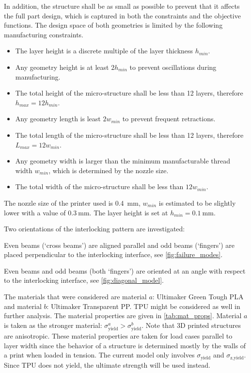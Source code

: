 In addition, the structure shall be as small as possible to prevent that it affects the full part design, which is captured in both the constraints and the objective functions.
The design space of both geometries is limited by the following manufacturing constraints.
\begin{itemize}
	\setlength\itemsep{0mm}
	\item The layer height is a discrete multiple of the layer thickness $h_{min}$.
	\item Any geometry height is at least $2 h_{min}$ to prevent oscillations during manufacturing.
	\item The total height of the micro-structure shall be less than 12 layers, therefore $h_{max}=12 h_{min}$.
	\item Any geometry length is least $2w_{min}$ to prevent frequent retractions.
	\item The total length of the micro-structure shall be less than 12 layers, therefore $L_{max} = 12 w_{min}$.
	\item Any geometry width is larger than the minimum manufacturable thread width $w_{min}$, which is determined by the nozzle size.
	\item The total width of the micro-structure shall be less than $12w_{min}$.
\end{itemize}

The nozzle size of the printer used is \SI{0.4}{\milli\meter}, $w_{min}$ is estimated to be slightly lower with a value of $\SI{0.3}{\milli\meter}$.
The layer height is set at $h_{min}=\SI{0.1}{\milli\meter}$.

Two orientations of the interlocking pattern are investigated:
\begin{description}
	\setlength\itemsep{0em}
	\item[Straight] Even beams (`cross beams') are aligned parallel and odd beams (`fingers') are placed perpendicular to the interlocking interface, see \cref{fig:failure_modes}.
	\item[Diagonal] Even beams and odd beams (both `fingers') are oriented at an angle with respect to the interlocking interface, see \cref{fig:diagonal_model}.
\end{description}

The materials that were considered are material $a$: Ultimaker Green Tough PLA and material $b$: Ultimaker Transparent PP. 
TPU might be considered as well in further analysis. 
The material properties are given in \cref{tab:mat_props}.
Material $a$ is taken as the stronger material: $\sigma^a_\text{yield} > \sigma^b_\text{yield} $.
Note that 3D printed structures are anisotropic.
These material properties are taken for load cases parallel to layer width since the behavior of a structure is determined mostly by the walls of a print when loaded in tension. 
The current model only involves $\sigma_\text{yield}$ and $\sigma_\text{z,yield}$. 
Since TPU does not yield, the ultimate strength will be used instead.




